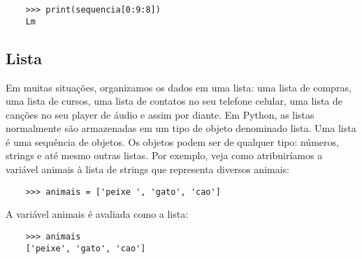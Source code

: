 \begin{itemize}
\begin{lstlisting}
    >>> print(sequencia[0:9:8])
    Lm
        \end{lstlisting}

    \end{itemize}

			\subsection{Lista}
			Em muitas situações, organizamos os dados em uma lista: uma lista de compras, uma lista de
			cursos, uma lista de contatos no seu telefone celular, uma lista de canções no seu player de áudio
			e assim por diante. Em Python, as listas normalmente são armazenadas em um tipo de objeto
			denominado lista. Uma lista é uma sequência de objetos. Os objetos podem ser de qualquer tipo:
			números, strings e até mesmo outras listas. Por exemplo, veja como atribuiríamos a
			variável animais à lista de strings que representa diversos animais:
			
			\begin{lstlisting}
	>>> animais = ['peixe ', 'gato', 'cao']
			\end{lstlisting}
		
			A variável animais é avaliada como a lista:
			
			\begin{lstlisting}
	>>> animais
	['peixe', 'gato', 'cao']
			\end{lstlisting}
			
